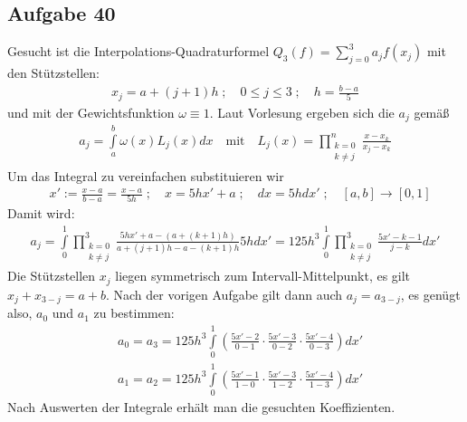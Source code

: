 \subsection*{Aufgabe 40}
Gesucht ist die Interpolations-Quadraturformel $Q_3(f) = \sum_{j=0}^3 a_j f(x_j)$
mit den Stützstellen:
\begin{align*}
  x_j = a + (j + 1) h\;;\quad 0 \le j \le 3 \;;\quad h = \frac{b-a}{5}
\end{align*}
und mit der Gewichtsfunktion $\omega \equiv 1$. Laut Vorlesung ergeben sich die $a_j$ gemäß
\begin{align*}
  a_j = \int \limits_a^b \omega(x) L_j(x) dx \quad \text{mit} \quad
 L_j(x) = \prod_{\substack{k = 0 \\k \neq j}}^n \frac{x - x_k}{x_j - x_k}
\end{align*}
Um das Integral zu vereinfachen substituieren wir
\begin{align*}
  & x' := \frac{x - a}{b - a} = \frac{x - a}{5 h} \;;\quad x = 5 h x' + a \;;\quad dx = 5 h dx' \;;\quad
  [a,b] \rightarrow [0,1]
\end{align*}
Damit wird:
\begin{align*}
  a_j = \int \limits_0^1 \prod_{\substack{k = 0 \\k \neq j}}^3
  \frac{5 h x' + a - (a + (k+1) h)}{a + (j+1)h - a - (k+1) h } 5 h dx' =
  125 h^3 \int \limits_0^1 \prod_{\substack{k = 0 \\k \neq j}}^3
  \frac{5 x' - k - 1}{j-k} d x'
\end{align*}
Die Stützstellen $x_j$ liegen symmetrisch zum Intervall-Mittelpunkt, es gilt
$x_j + x_{3-j} = a + b$. Nach der vorigen Aufgabe gilt dann auch $a_j = a_{3-j}$,
es genügt also, $a_0$ und $a_1$ zu bestimmen:
\begin{align*}
  & a_0 = a_3 = 125 h^3 \int \limits_0^1 \left(\frac{5x'-2}{0-1} \cdot \frac{5x'-3}{0-2} \cdot \frac{5x'-4}{0-3} \right) dx' \\
  & a_1 = a_2 = 125 h^3 \int \limits_0^1 \left(\frac{5x'-1}{1-0} \cdot \frac{5x'-3}{1-2} \cdot \frac{5x'-4}{1-3} \right) dx'
\end{align*}
Nach Auswerten der Integrale erhält man die gesuchten Koeffizienten.




